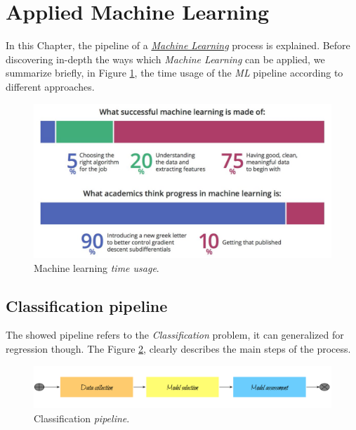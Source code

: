 

\section{Applied Machine Learning}

In this Chapter, the pipeline of a \href{https://github.com/papers-we-love/seattle/tree/master/useful-things-to-know-about-ml}{\emph{Machine Learning}} process is explained. Before discovering in-depth the ways which \emph{Machine Learning} can be applied, we summarize briefly, in Figure \ref{pic:time_usage}, the time usage of the \emph{ML} pipeline according to different approaches. 

\begin{figure}[H]%
 \centering
 \includegraphics[width=13cm]{./img/08/time_usage}
 \caption{\label{pic:time_usage} Machine learning \emph{time usage}.}
\end{figure}

\subsection{Classification pipeline}

The showed pipeline refers to the \emph{Classification} problem, it can generalized for regression though. The Figure \ref{pic:classification_pipeline}, clearly describes the main steps of the process.

\begin{figure}[H]%
 \centering
 \includegraphics[width=13cm]{./img/08/classification_pipeline}
 \caption{\label{pic:classification_pipeline} Classification \emph{pipeline}.}
\end{figure}

